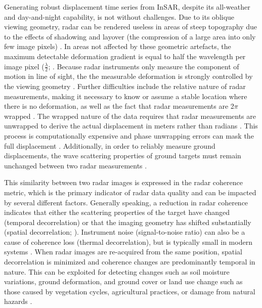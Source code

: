 \documentclass[nhess, manuscript]{copernicus}
\begin{document}
Generating robust displacement time series from InSAR, despite its all-weather and day-and-night capability, is not without challenges. Due to its oblique viewing geometry, radar can be rendered useless in areas of steep topography due to the effects of shadowing and layover (the compression of a large area into only few image pixels) \citep{wasowski2014, lillesand2015}. In areas not affected by these geometric artefacts, the maximum detectable deformation gradient is equal to half the wavelength per image pixel ($\frac{\lambda}{2}$; \cite{massonnet1998}. Because radar instruments only measure the component of motion in line of sight, the the measurable deformation is strongly controlled by the viewing geometry \citep{massonnet1998}. Further difficulties include the relative nature of radar measurements, making it necessary to know or assume a stable location where there is no deformation, as well as the fact that radar measurements are 2$\pi$ wrapped \citep{wasowski2014, massonnet1998}. The wrapped nature of the data requires that radar measurements are unwrapped to derive the actual displacement in meters rather than radians \citep{massonnet1998, chen2002}. This process is computationally expensive and phase unwrapping errors can mask the full displacement \citep{wasowski2014}. Additionally, in order to reliably measure ground displacements, the wave scattering properties of ground targets must remain unchanged between two radar measurements \citep{massonnet1998, zebker1992}.  \par 

This similarity between two radar images is expressed in the radar coherence metric, which is the primary indicator of radar data quality and can be impacted by several different factors. Generally speaking, a reduction in radar coherence indicates that either the scattering properties of the target have changed (temporal decorrelation) or that the imaging geometry has shifted substantially (spatial decorrelation; \cite{zebker1992, rosen2000}). Instrument noise (signal-to-noise ratio) can also be a cause of coherence loss (thermal decorrelation), but is typically small in modern systems \citep{zebker1992}. When radar images are re-acquired from the same position, spatial decorrelation is minimized and coherence changes are predominantly temporal in nature. This can be exploited for detecting changes such as soil moisture variations, ground deformation, and ground cover or land use change such as those caused by vegetation cycles, agricultural practices, or damage from natural hazards \citep[e.g.][]{burrows2019, fielding2005, yun2015, musa2015}. \par 
\end{document}
